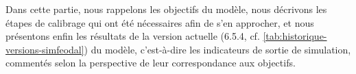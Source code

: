 Dans cette partie, nous rappelons les objectifs du modèle, nous décrivons les étapes de calibrage qui ont été nécessaires afin de s'en approcher, et nous présentons enfin les résultats de la version actuelle (6.5.4, cf. \cref{tab:historique-versions-simfeodal}) du modèle, c'est-à-dire les indicateurs de sortie de simulation, commentés selon la perspective de leur correspondance aux objectifs.
%
%
%
%
%

